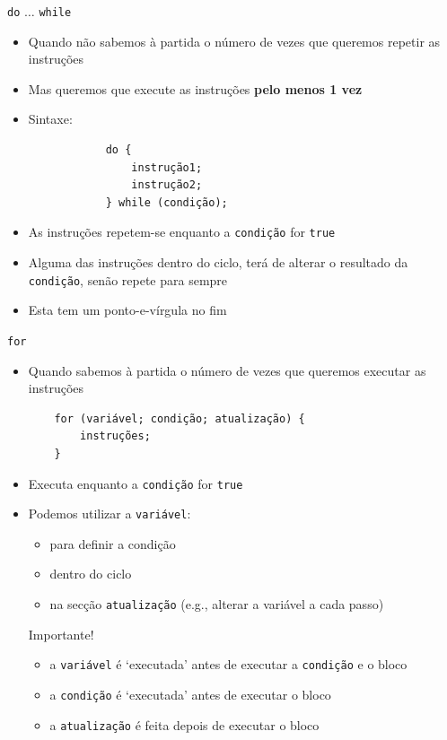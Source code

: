 \documentclass[portuguese, aspectratio=169, xcolor=table]{beamer}
\begin{document}
\begin{frame}[fragile]{\texttt{do} $\ldots$ \texttt{while}}
    \begin{itemize}
        \item Quando não sabemos à partida o número de vezes que queremos repetir as instruções
        \item Mas queremos que execute as instruções \textbf{pelo menos 1 vez}
        \item Sintaxe:
        \begin{verbatim}
            do {
                instrução1;
                instrução2;
            } while (condição);
        \end{verbatim}
        \item As instruções repetem-se enquanto a \texttt{condição} for \texttt{true}
        \item Alguma das instruções dentro do ciclo, terá de alterar o resultado da \texttt{condição}, senão repete para sempre
        \item Esta tem um ponto-e-vírgula no fim
    \end{itemize}
\end{frame}


\begin{frame}[fragile]{\texttt{for}}
\begin{itemize}
    \item Quando sabemos à partida o número de vezes que queremos executar as instruções
    \begin{verbatim}
    for (variável; condição; atualização) {
        instruções;
    }
    \end{verbatim}
\item Executa enquanto a \texttt{condição} for \texttt{true}
\item Podemos utilizar a \texttt{variável}:
\begin{itemize}
    \item para definir a condição
    \item dentro do ciclo
    \item na secção \texttt{atualização} (e.g., alterar a variável a cada passo)
\end{itemize}

\begin{block}{Importante!}
\begin{itemize}
    \item a \texttt{variável} é `executada' antes de executar a \texttt{condição} e o bloco
    \item a \texttt{condição} é `executada' antes de executar o bloco
    \item a \texttt{atualização} é feita depois de executar o bloco
\end{itemize}
\end{block}


\end{itemize}
\end{frame}
\end{document}
